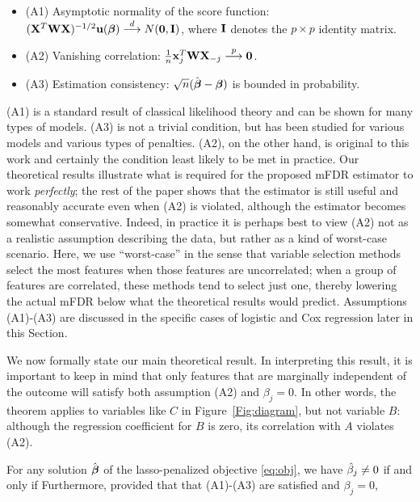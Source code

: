 \begin{itemize}
\item (A1) Asymptotic normality of the score function: $(\mathbf{X}^T\mathbf{W}\mathbf{X})^{-1/2}\mathbf{u}(\boldsymbol{\beta}) \overset{d}{\longrightarrow} N(\mathbf{0},  \mathbf{I})$, where $\mathbf{I}$ denotes the $p \times p$ identity matrix.
\item (A2) Vanishing correlation: $\frac{1}{n}\mathbf{x}_j^T\mathbf{W}\mathbf{X}_{-j} \overset{p}{\longrightarrow} \mathbf{0}$.
\item (A3) Estimation consistency: $\sqrt{n}(\hat{\boldsymbol{\beta}}-  \boldsymbol{\beta})$ is bounded in probability.
\end{itemize}

(A1) is a standard result of classical likelihood theory and can be shown for many types of models.  (A3) is not a trivial condition, but has been studied for various models and various types of penalties.  (A2), on the other hand, is original to this work and certainly the condition least likely to be met in practice.  Our theoretical results illustrate what is required for the proposed mFDR estimator to work {\em perfectly}; the rest of the paper shows that the estimator is still useful and reasonably accurate even when (A2) is violated, although the estimator becomes somewhat conservative.  Indeed, in practice it is perhaps best to view (A2) not as a realistic assumption describing the data, but rather as a kind of worst-case scenario.  Here, we use ``worst-case'' in the sense that variable selection methods select the most features when those features are uncorrelated; when a group of features are correlated, these methods tend to select just one, thereby lowering the actual mFDR below what the theoretical results would predict.  Assumptions (A1)-(A3) are discussed in the specific cases of logistic and Cox regression later in this Section.

We now formally state our main theoretical result.  In interpreting this result, it is important to keep in mind that only features that are marginally independent of the outcome will satisfy both assumption (A2) and $\beta_j=0$.
In other words, the theorem applies to variables like $C$ in Figure~\ref{Fig:diagram}, but not variable $B$: although the regression coefficient for $B$ is zero, its correlation with $A$ violates (A2).

\begin{theorem}
  \label{Thm:main}
  For any solution $\hat{\boldsymbol{\beta}}$ of the lasso-penalized objective \eqref{eq:obj}, we have $\hat{\beta}_j \neq 0$ if and only if
  Furthermore, provided that that (A1)-(A3) are satisfied and $\beta_j=0$,
\end{theorem}

